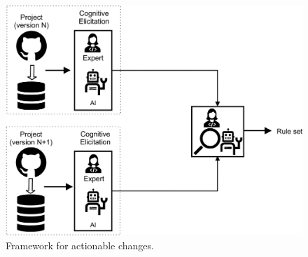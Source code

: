 \begin{figure}
\includegraphics[width=\linewidth]{flow.png}
\caption{Framework for actionable changes.}
\label{fig:xtree}
\end{figure}